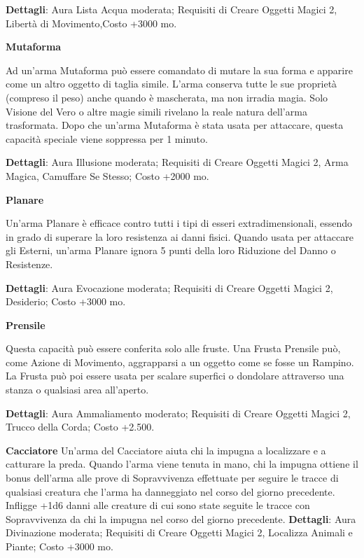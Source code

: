 \documentclass[a4paper,twoside,openany]{book}
\begin{document}
\textbf{Dettagli}: Aura Lista Acqua moderata; Requisiti di Creare Oggetti Magici 2, Libertà di Movimento,Costo +3000 mo.

\smallskip* \textbf{Mutaforma}\hypertarget{Armi Mutaforma}{}

Ad un'arma Mutaforma può essere comandato di mutare la sua forma e apparire come un altro oggetto di taglia simile. L'arma conserva tutte le sue proprietà (compreso il peso) anche quando è mascherata, ma non irradia magia. Solo Visione del Vero o altre magie simili rivelano la reale natura dell'arma trasformata. Dopo che un'arma Mutaforma è stata usata per attaccare, questa capacità speciale viene soppressa per 1 minuto.

\textbf{Dettagli}: Aura Illusione moderata; Requisiti di Creare Oggetti Magici 2, Arma Magica, Camuffare Se Stesso; Costo +2000 mo.

\smallskip* \textbf{Planare}\hypertarget{Planare}{}

Un'arma Planare è efficace contro tutti i tipi di esseri extradimensionali, essendo in grado di superare la loro resistenza ai danni fisici. Quando usata per attaccare gli Esterni, un'arma Planare ignora 5 punti della loro Riduzione del Danno o Resistenze.

\textbf{Dettagli}: Aura Evocazione moderata; Requisiti di Creare Oggetti Magici 2, Desiderio; Costo +3000 mo.

\smallskip* \textbf{Prensile}\hypertarget{Prensile}{}

Questa capacità può essere conferita solo alle fruste. Una Frusta Prensile può, come Azione di Movimento, aggrapparsi a un oggetto come se fosse un Rampino. La Frusta può poi essere usata per scalare superfici o dondolare attraverso una stanza o qualsiasi area all'aperto.

\textbf{Dettagli}: Aura Ammaliamento moderato; Requisiti di Creare Oggetti Magici 2, Trucco della Corda; Costo +2.500.

\smallskip* \textbf{Cacciatore}\hypertarget{Cacciatore}{}
Un'arma del Cacciatore aiuta chi la impugna a localizzare e a catturare la preda. Quando l'arma viene tenuta in mano, chi la impugna ottiene il bonus dell'arma alle prove di Sopravvivenza effettuate per seguire le tracce di qualsiasi creatura che l'arma ha danneggiato nel corso del giorno precedente. Infligge +1d6 danni alle creature di cui sono state seguite le tracce con Sopravvivenza da chi la impugna nel corso del giorno precedente.
\textbf{Dettagli}: Aura Divinazione moderata; Requisiti di Creare Oggetti Magici 2, Localizza Animali e Piante; Costo +3000 mo.
\end{document}
